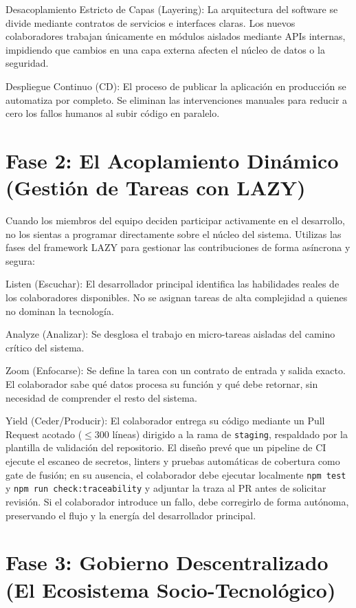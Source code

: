 \documentclass[14pt,a4paper,oneside]{extbook}
\begin{document}
Desacoplamiento Estricto de Capas (Layering): La arquitectura del software se divide mediante contratos de servicios e interfaces claras. Los nuevos colaboradores trabajan únicamente en módulos aislados mediante APIs internas, impidiendo que cambios en una capa externa afecten el núcleo de datos o la seguridad.

Despliegue Continuo (CD): El proceso de publicar la aplicación en producción se automatiza por completo. Se eliminan las intervenciones manuales para reducir a cero los fallos humanos al subir código en paralelo.

\section{Fase 2: El Acoplamiento Dinámico (Gestión de Tareas con LAZY)}

Cuando los miembros del equipo deciden participar activamente en el desarrollo, no los sientas a programar directamente sobre el núcleo del sistema. Utilizas las fases del framework LAZY para gestionar las contribuciones de forma asíncrona y segura:

Listen (Escuchar): El desarrollador principal identifica las habilidades reales de los colaboradores disponibles. No se asignan tareas de alta complejidad a quienes no dominan la tecnología.

Analyze (Analizar): Se desglosa el trabajo en micro-tareas aisladas del camino crítico del sistema.

Zoom (Enfocarse): Se define la tarea con un contrato de entrada y salida exacto. El colaborador sabe qué datos procesa su función y qué debe retornar, sin necesidad de comprender el resto del sistema.

Yield (Ceder/Producir): El colaborador entrega su código mediante un Pull Request acotado ($\le 300$ líneas) dirigido a la rama de \texttt{staging}, respaldado por la plantilla de validación del repositorio. El diseño prevé que un pipeline de CI ejecute el escaneo de secretos, linters y pruebas automáticas de cobertura como gate de fusión; en su ausencia, el colaborador debe ejecutar localmente \texttt{npm test} y \texttt{npm run check:traceability} y adjuntar la traza al PR antes de solicitar revisión. Si el colaborador introduce un fallo, debe corregirlo de forma autónoma, preservando el flujo y la energía del desarrollador principal.

\section{Fase 3: Gobierno Descentralizado (El Ecosistema Socio-Tecnológico)}
\end{document}
